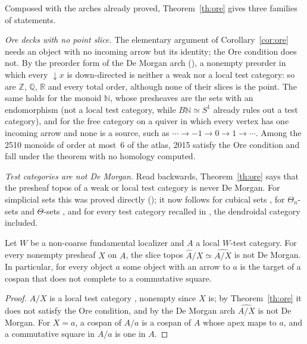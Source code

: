 Composed with the arches already proved, Theorem~\ref{th:ore} gives three families of statements.

\emph{Ore decks with no point slice.} The elementary argument of Corollary~\ref{cor:ore} needs an object with no incoming arrow but its identity; the Ore condition does not. By the preorder form of the De Morgan arch (), a nonempty preorder in which every $\downarrow x$ is down-directed is neither a weak nor a local test category: so are $\mathbb Z$, $\mathbb Q$, $\mathbb R$ and every total order, although none of their slices is the point. The same holds for the monoid $\mathbb N$, whose presheaves are the sets with an endomorphism (not a local test category, while $B\mathbb N\simeq S^1$ already rules out a test category), and for the free category on a quiver in which every vertex has one incoming arrow and none is a source, such as $\cdots\to-1\to0\to1\to\cdots$. Among the 2510 monoids of order at most~6 of the atlas, 2015 satisfy the Ore condition and fall under the theorem with no homology computed.

\emph{Test categories are not De Morgan.} Read backwards, Theorem~\ref{th:ore} says that the presheaf topos of a weak or local test category is never De Morgan. For simplicial sets this was proved directly (); it now follows for cubical sets \cite[Cor.~8.4.13]{cisinski-308}, for $\Theta_n$-sets and $\Theta$-sets \cite[Th.~6.5]{hubert-dk}, and for every test category recalled in \cite[introduction]{hubert-dk}, the dendroidal category included.

\begin{proposition}\label{prop:slices}
Let $W$ be a non-coarse fundamental localizer and $A$ a local $W$-test category. For every nonempty presheaf $X$ on $A$, the slice topos $\widehat A/X\simeq\widehat{A/X}$ is not De Morgan. In particular, for every object $a$ some object with an arrow to $a$ is the target of a cospan that does not complete to a commutative square.
\end{proposition}

\begin{proof}
$A/X$ is a local test category \cite[Prop.~4.1.14 (v)]{cisinski-308}, nonempty since $X$ is; by Theorem~\ref{th:ore} it does not satisfy the Ore condition, and by the De Morgan arch $\widehat{A/X}$ is not De Morgan. For $X = a$, a cospan of $A/a$ is a cospan of $A$ whose apex maps to $a$, and a commutative square in $A/a$ is one in $A$.
\end{proof}

